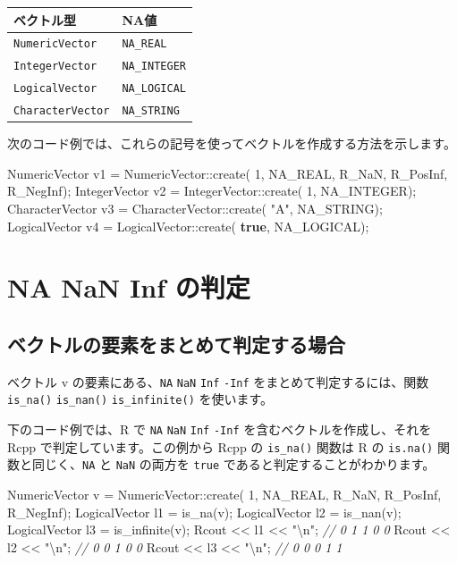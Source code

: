 \documentclass[]{book}
\newenvironment{Shaded}{\begin{snugshade}}{\end{snugshade}}
\newcommand{\CommentTok}[1]{\textcolor[rgb]{0.56,0.35,0.01}{\textit{#1}}}
\newcommand{\DecValTok}[1]{\textcolor[rgb]{0.00,0.00,0.81}{#1}}
\newcommand{\KeywordTok}[1]{\textcolor[rgb]{0.13,0.29,0.53}{\textbf{#1}}}
\newcommand{\NormalTok}[1]{#1}
\newcommand{\SpecialCharTok}[1]{\textcolor[rgb]{0.00,0.00,0.00}{#1}}
\newcommand{\StringTok}[1]{\textcolor[rgb]{0.31,0.60,0.02}{#1}}
\begin{document}
\begin{longtable}[]{@{}ll@{}}
\toprule
ベクトル型 & NA値\tabularnewline
\midrule
\endhead
\texttt{NumericVector} & \texttt{NA\_REAL}\tabularnewline
\texttt{IntegerVector} & \texttt{NA\_INTEGER}\tabularnewline
\texttt{LogicalVector} & \texttt{NA\_LOGICAL}\tabularnewline
\texttt{CharacterVector} & \texttt{NA\_STRING}\tabularnewline
\bottomrule
\end{longtable}

次のコード例では、これらの記号を使ってベクトルを作成する方法を示します。

\begin{Shaded}
\begin{Highlighting}[]
\NormalTok{NumericVector   v1 = NumericVector::create( }\DecValTok{1}\NormalTok{, NA_REAL, R_NaN, R_PosInf, R_NegInf);}
\NormalTok{IntegerVector   v2 = IntegerVector::create( }\DecValTok{1}\NormalTok{, NA_INTEGER);}
\NormalTok{CharacterVector v3 = CharacterVector::create( }\StringTok{"A"}\NormalTok{, NA_STRING);}
\NormalTok{LogicalVector   v4 = LogicalVector::create( }\KeywordTok{true}\NormalTok{, NA_LOGICAL);}
\end{Highlighting}
\end{Shaded}

\hypertarget{na-nan-inf-}{%
\section{NA NaN Inf の判定}\label{na-nan-inf-}}

\subsection{ベクトルの要素をまとめて判定する場合}

ベクトル v の要素にある、\texttt{NA} \texttt{NaN} \texttt{Inf} \texttt{-Inf} をまとめて判定するには、関数\texttt{is\_na()} \texttt{is\_nan()} \texttt{is\_infinite()} を使います。

下のコード例では、R で \texttt{NA} \texttt{NaN} \texttt{Inf} \texttt{-Inf} を含むベクトルを作成し、それを Rcpp で判定しています。この例から Rcpp の \texttt{is\_na()} 関数は R の \texttt{is.na()} 関数と同じく、\texttt{NA} と \texttt{NaN} の両方を \texttt{true} であると判定することがわかります。

\begin{Shaded}
\begin{Highlighting}[]
\NormalTok{NumericVector v =}
\NormalTok{    NumericVector::create( }\DecValTok{1}\NormalTok{, NA_REAL, R_NaN, R_PosInf, R_NegInf);}
\NormalTok{LogicalVector l1 = is_na(v);}
\NormalTok{LogicalVector l2 = is_nan(v);}
\NormalTok{LogicalVector l3 = is_infinite(v);}
\NormalTok{Rcout << l1 << }\StringTok{"}\SpecialCharTok{\textbackslash{}n}\StringTok{"}\NormalTok{; }\CommentTok{// 0 1 1 0 0}
\NormalTok{Rcout << l2 << }\StringTok{"}\SpecialCharTok{\textbackslash{}n}\StringTok{"}\NormalTok{; }\CommentTok{// 0 0 1 0 0}
\NormalTok{Rcout << l3 << }\StringTok{"}\SpecialCharTok{\textbackslash{}n}\StringTok{"}\NormalTok{; }\CommentTok{// 0 0 0 1 1}
\end{Highlighting}
\end{Shaded}
\end{document}
